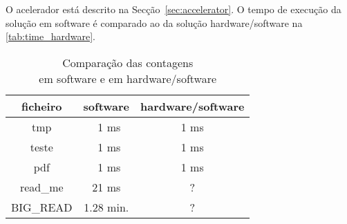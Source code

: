   O acelerador está descrito na Secção~\ref{sec:accelerator}. O tempo de execução da solução em software é comparado ao da solução hardware/software na \autoref{tab:time_hardware}.


  \begin{table}[H]
    \centering
    \caption{Comparação das contagens \\em software e em hardware/software}

    \begin{tabular}{|c|c|c|}
      \hline
      ficheiro   & software   & hardware/software \\ \hline \hline
      tmp        & \ 1 ms     & 1 ms         \\ \hline
      teste      & \ 1 ms     & 1 ms         \\ \hline
      pdf        & \ 1 ms     & 1 ms         \\ \hline
      read\_me   & 21 ms      & ?          \\ \hline
      BIG\_READ  & 1.28 min.  & ?         \\
      \hline
    \end{tabular}
    \label{tab:time_hardware}
  \end{table}

